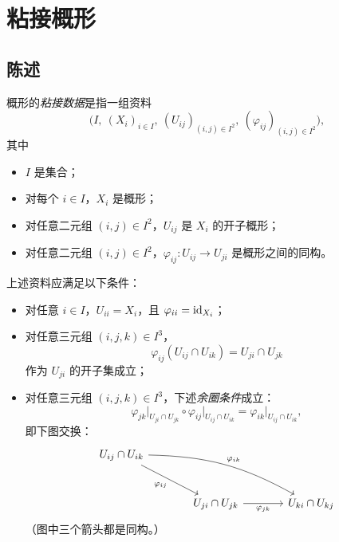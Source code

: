 
\makeatletter
{}
\makeatother

\section{粘接概形}\label{sec:6}

\subsection{陈述}\label{sec:6.1}

\begin{definition}\label{def:6.1.1}
概形的\emph{粘接数据}是指一组资料
\[
\bigl(I,\ (X_i)_{i\in I},\ (U_{ij})_{(i,j)\in I^2},\ (\varphi_{ij})_{(i,j)\in I^2}\bigr),
\]
其中
\begin{itemize}[leftmargin=1.6em,itemsep=0.2ex]
  \item $I$ 是集合；
  \item 对每个 $i\in I$，$X_i$ 是概形；
  \item 对任意二元组 $(i,j)\in I^2$，$U_{ij}$ 是 $X_i$ 的开子概形；
  \item 对任意二元组 $(i,j)\in I^2$，$\varphi_{ij}:U_{ij}\to U_{ji}$ 是概形之间的同构。
\end{itemize}
上述资料应满足以下条件：
\begin{itemize}[leftmargin=1.6em,itemsep=0.2ex]
  \item 对任意 $i\in I$，$U_{ii}=X_i$，且 $\varphi_{ii}=\operatorname{id}_{X_i}$；
  \item 对任意三元组 $(i,j,k)\in I^3$，
\[
\varphi_{ij}(U_{ij}\cap U_{ik})=U_{ji}\cap U_{jk}
\]
作为 $U_{ji}$ 的开子集成立；
  \item 对任意三元组 $(i,j,k)\in I^3$，下述\emph{余圈条件}成立：
\[
\varphi_{jk}\big|_{U_{ji}\cap U_{jk}}\circ\varphi_{ij}\big|_{U_{ij}\cap U_{ik}}
=\varphi_{ik}\big|_{U_{ij}\cap U_{ik}},
\]
即下图交换：
\[
\begin{tikzcd}[column sep=large,row sep=large]
U_{ij}\cap U_{ik}\arrow[dr,"\varphi_{ij}"']\arrow[drr,bend left=14,"\varphi_{ik}"] & {} & \\
& U_{ji}\cap U_{jk}\arrow[r,"\varphi_{jk}"'] & U_{ki}\cap U_{kj}
\end{tikzcd}
\]
（图中三个箭头都是同构。）
\end{itemize}
\end{definition}

